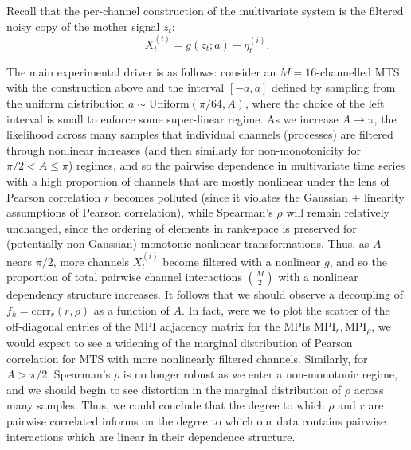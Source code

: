 \documentclass{article}
\theoremstyle{plain}
\theoremstyle{definition}
\theoremstyle{remark}
\begin{document}
Recall that the per-channel construction of the multivariate system is the filtered noisy copy of the mother signal $z_t$:
\begin{equation*}
    X_t^{(i)} = g(z_t;a) + \eta_t^{(i)}.
\end{equation*} 

The main experimental driver is as follows: consider an $M=16$-channelled MTS with the construction above and the interval $[-a,a]$ defined by sampling from the uniform distribution $a \sim \mathrm{Uniform}(\pi / 64, A)$, where the choice of the left interval is small to enforce some super-linear regime. As we increase $A \to \pi$, the likelihood across many samples that individual channels (processes) are filtered through nonlinear increases (and then similarly for non-monotonicity for $\pi/2 < A \leq \pi$) regimes, and so the pairwise dependence in multivariate time series with a high proportion of channels that are mostly nonlinear under the lens of Pearson correlation $r$ becomes polluted (since it violates the Gaussian + linearity assumptions of Pearson correlation), while Spearman’s $\rho$ will remain relatively unchanged, since the ordering of elements in rank-space is preserved for (potentially non-Gaussian) monotonic nonlinear transformations. Thus, as $A$ nears $\pi/2$, more channels $X_t^{(i)}$ become filtered with a nonlinear $g$, and so the proportion of total pairwise channel interactions ${M \choose 2}$ with a nonlinear dependency structure increases. It follows that we should observe a decoupling of $f_k = \mathrm{corr}_r(r, \rho)$ as a function of $A$. In fact, were we to plot the scatter of the off-diagonal entries of the MPI adjacency matrix for the MPIs $\mathrm{MPI}_{r}, \mathrm{MPI}_{\rho}$, we would expect to see a widening of the marginal distribution of Pearson correlation for MTS with more nonlinearly filtered channels. Similarly, for $A > \pi/2$, Spearman’s $\rho$ is no longer robust as we enter a non-monotonic regime, and we should begin to see distortion in the marginal distribution of $\rho$ across many samples. Thus, we could conclude that the degree to which $\rho$ and $r$ are pairwise correlated informs on the degree to which our data contains pairwise interactions which are linear in their dependence structure. 
\end{document}
